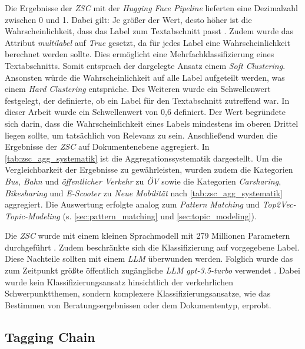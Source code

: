 Die Ergebnisse der \textit{ZSC} mit der \textit{Hugging Face Pipeline} lieferten eine Dezimalzahl zwischen 0 und 1. Dabei gilt: Je größer der Wert, desto höher ist die Wahrscheinlichkeit, dass das Label zum Textabschnitt passt \parencite{huggingfacec}. Zudem wurde das Attribut \textit{multilabel} auf \textit{True} gesetzt, da für jedes Label eine Wahrscheinlichkeit berechnet werden sollte. Dies ermöglicht eine Mehrfachklassifizierung eines Textabschnitts. Somit entsprach der dargelegte Ansatz einem \textit{Soft Clustering}. Ansonsten würde die Wahrscheinlichkeit auf alle Label aufgeteilt werden, was einem \textit{Hard Clustering} entspräche. Des Weiteren wurde ein Schwellenwert festgelegt, der definierte, ob ein Label für den Textabschnitt zutreffend war. In dieser Arbeit wurde ein Schwellenwert von 0,6 definiert. Der Wert begründete sich darin, dass die Wahrscheinlichkeit eines Labels mindestens im oberen Drittel liegen sollte, um tatsächlich von Relevanz zu sein. Anschließend wurden die Ergebnisse der \textit{ZSC} auf Dokumentenebene aggregiert. In \autoref{tab:zsc_agg_systematik} ist die Aggregationssystematik dargestellt. Um die Vergleichbarkeit der Ergebnisse zu gewährleisten, wurden zudem die Kategorien \textit{Bus}, \textit{Bahn} und \textit{öffentlicher Verkehr} zu \textit{ÖV} sowie die Kategorien \textit{Carsharing}, \textit{Bikesharing} und \textit{E-Scooter} zu \textit{Neue Mobilität} nach \autoref{tab:zsc_agg_systematik} aggregiert. Die Auswertung erfolgte analog zum \textit{Pattern Matching} und \textit{Top2Vec-Topic-Modeling} (s. \autoref{sec:pattern_matching} und \ref{sec:topic_modeling}).



Die \textit{ZSC} wurde mit einem kleinen Sprachmodell mit 279 Millionen Parametern durchgeführt \parencite{laurer2023}. Zudem beschränkte sich die Klassifizierung auf vorgegebene Label. Diese Nachteile sollten mit einem \textit{LLM} überwunden werden. Folglich wurde das zum Zeitpunkt größte öffentlich zugängliche \textit{LLM} \textit{gpt-3.5-turbo} verwendet \parencite[10]{brown2020}. Dabei wurde kein Klassifizierungsansatz hinsichtlich der verkehrlichen Schwerpunktthemen, sondern komplexere Klassifizierungsansatze, wie das Bestimmen von Beratungsergebnissen oder dem Dokumententyp, erprobt.

\subsection{Tagging Chain}

